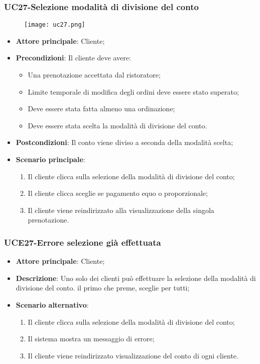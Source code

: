 \nonstopmode

\subsubsection{UC27-Selezione modalità di divisione del conto}
\begin{figure}[h] \texttt{[image: uc27.png]} \end{figure}

\begin{itemize}
\item \textbf{Attore principale}: Cliente;
\item \textbf{Precondizioni}: Il cliente deve avere:
\begin{itemize}
\item Una prenotazione accettata dal ristoratore;
\item Limite temporale di modifica degli ordini deve essere stato superato;
\item Deve essere stata fatta almeno una ordinazione;
\item Deve essere stata scelta la modalità di divisione del conto.
\end{itemize}
\item \textbf{Postcondizioni}: Il conto viene diviso a seconda della modalità scelta;
\item \textbf{Scenario principale}:
\begin{enumerate}
\item Il cliente clicca sulla selezione della modalità di divisione del conto;
\item Il cliente clicca sceglie se pagamento equo o proporzionale;
\item Il cliente viene reindirizzato alla visualizzazione della singola prenotazione.
\end{enumerate}
\end{itemize}

\subsubsection{UCE27-Errore selezione già effettuata}

\begin{itemize}
\item \textbf{Attore principale}: Cliente;
\item \textbf{Descrizione}: Uno solo dei clienti può effettuare la selezione della modalità di divisione del conto. il primo che preme, sceglie per tutti;
\item \textbf{Scenario alternativo}:
\begin{enumerate}
\item Il cliente clicca sulla selezione della modalità di divisione del conto;
\item Il sistema mostra un messaggio di errore;
\item Il cliente viene reindirizzato visualizzazione del conto di ogni cliente.
\end{enumerate}
\end{itemize}

